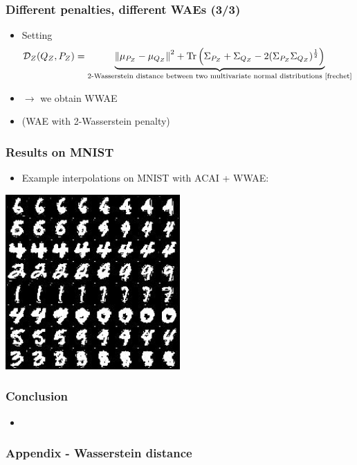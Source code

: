 \documentclass{beamer}
\DeclareMathOperator{\Tr}{Tr}
\begin{document}
\begin{frame}
\frametitle{Different penalties, different WAEs (3/3)}
\begin{itemize}
  \item Setting $$ \mathcal{D}_Z(Q_Z,P_Z) = \underbrace{\left\| \mu_{P_Z} - \mu_{Q_Z} \right\|^2 +
    \Tr \left( \Sigma_{P_Z} + \Sigma_{Q_Z} -
    2(\Sigma_{P_Z}\Sigma_{Q_Z})^{\frac{1}{2}} \right)}_{\text{2-Wasserstein distance between two multivariate normal distributions \cite{frechet}}} $$
  \item[] $\rightarrow$ we obtain WWAE
  \item[] (WAE with 2-Wasserstein penalty)
  \bigskip
\end{itemize}
\end{frame}
\begin{frame}
\frametitle{Results on MNIST}
\begin{itemize}
  \item Example interpolations on MNIST with ACAI + WWAE:
\end{itemize}
\begin{center}
\includegraphics[width=0.5\textwidth,keepaspectratio]{./figures/01-mnist-interpolations}
\end{center}
\end{frame}
\begin{frame}
\frametitle{Conclusion}
\begin{itemize}
  \item
\end{itemize}
\end{frame}
\begin{frame}
\frametitle{Appendix - Wasserstein distance}

\end{frame}
\end{document}
